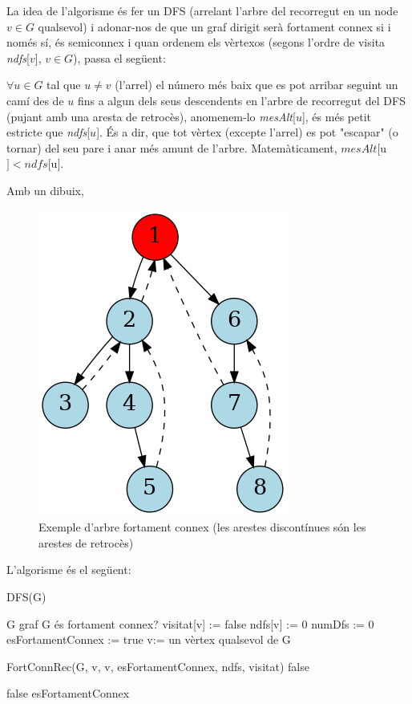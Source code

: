 \documentclass[a4paper,12pt]{article}
\begin{document}
La idea de l'algorisme és fer un DFS (arrelant l'arbre del recorregut en un node $v\in G$ qualsevol) i adonar-nos de que un graf dirigit serà fortament connex si i només sí, és semiconnex i quan ordenem els vèrtexos (segons l'ordre de visita \textit{ndfs}[$v$], $v \in G$), passa el següent:

$ \forall u \in G$ tal que $u \neq v$ (l'arrel) el número més baix que es pot arribar seguint un camí des de $u$ fins a algun dels seus descendents en l'arbre de recorregut del DFS (pujant amb una aresta de retrocès), anomenem-lo \textit{mesAlt}[$u$], és més petit estricte que \textit{ndfs}[$u$]. És a dir, que tot vèrtex (excepte l'arrel) es pot "escapar" (o tornar) del seu pare i anar més amunt de l'arbre. Matemàticament, $\textit{mesAlt}[$u$] < \textit{ndfs}[$u$]$.

Amb un dibuix,
\begin{figure}[H]
    \centering
    \includegraphics[width=0.3\linewidth]{graph.png}
    \caption{Exemple d'arbre fortament connex (les arestes discontínues són les arestes de retrocès)}
    \label{fig:G}
\end{figure}

L'algorisme és el següent:

\begin{algorithm}[H]
    \caption{DFS(G)}
    \begin{algorithmic}[1]  %
        \Require G graf
        \Ensure G és fortament connex?
            \State visitat[v] := false
            \State ndfs[v] := 0
        \EndFor
        \State
        \State numDfs := 0
        \State esFortamentConnex := true
        \State
        \State v:= un vèrtex qualsevol de G

        \State FortConnRec(G, v, v, esFortamentConnex, ndfs, visitat)
        \State
           \State \Return false
        \EndIf
        \State
        
                \State \Return false
            \EndIf
        \EndFor
        \State
        \State \Return esFortamentConnex
    \end{algorithmic}
\end{algorithm}
\end{document}
